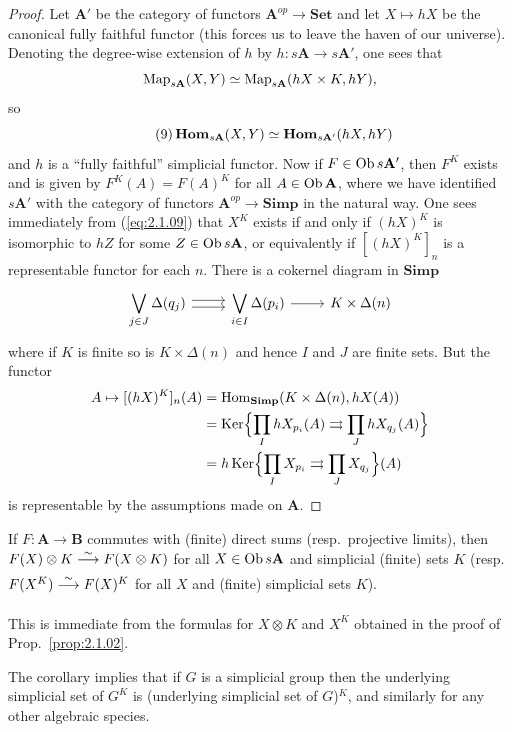 \documentclass[../main]{subfiles}
\begin{document}
\begin{proof}
Let $\mathbf A'$ be the category of functors $\mathbf A^{op} \longrightarrow \mathbf{Set}$ and let $X \mapsto hX$ be the canonical fully faithful functor (this forces us to leave the haven of our universe). Denoting the degree-wise extension of $h$ by $h \colon s\mathbf A \longrightarrow s\mathbf A'$, one sees that 
\[
\operatorname{Map}_{s\mathbf A}(X, Y) \simeq \operatorname{Map}_{s\mathbf A}(hX \times K, hY),
\]
so
\begin{equation}\tag{9}
\label{eq:2.1.09}
    \operatorname{\mathbf{Hom}}_{s\mathbf A}(X, Y) \simeq \operatorname{\mathbf{Hom}}_{s\mathbf A'}(hX, hY)
\end{equation}
and $h$ is a ``fully faithful'' simplicial functor. Now if $F \in \operatorname{Ob} s\mathbf A'$, then $F^K$ exists and is given by $F^K(A) = F(A)^K$ for all $A \in \operatorname{Ob}\mathbf A$, where we have identified $s\mathbf A'$ with the category of functors $\mathbf A^{op} \longrightarrow \mathbf{Simp}$ in the natural way. One sees immediately from (\ref{eq:2.1.09}) that $X^K$ exists if and only if $(hX)^K$ is isomorphic to $hZ$ for some $Z \in \operatorname{Ob} s\mathbf A$, or equivalently if $[(hX)^K]_n$ is a representable functor for each $n$. There is a cokernel diagram in $\mathbf{Simp}$ 
\[
\begin{tikzcd}
    \displaystyle\bigvee_{j \in J} \Delta(q_j) 
    \arrow[r, shift left = 1]
    \arrow[r, shift right = 1]
    &
    \displaystyle\bigvee_{i \in I} \Delta(p_i)
    \arrow[r]
    &
    K \times \Delta(n)
\end{tikzcd}
\]
where if $K$ is finite so is $K \times \Delta(n)$ and hence $I$ and $J$ are finite sets. But the functor 
\begin{align*}
    A \mapsto [(hX)^K]_n(A)
    &= \operatorname{Hom}_{\mathbf{Simp}} (K \times \Delta(n), hX(A))
    \\&= \operatorname{Ker}\Bigl\{\prod_I hX_{p_i} (A) \rightrightarrows \prod_J hX_{q_j}(A)\Bigr\}
    \\&= h\operatorname{Ker}\Bigl\{\prod_I X_{p_i} \rightrightarrows \prod_J X_{q_j}\Bigr\}(A)
\end{align*}
is representable by the assumptions made on $\mathbf A$.
\end{proof}

\begin{corollary*}
If $F \colon \mathbf A \longrightarrow \mathbf B$ commutes with (finite) direct sums (resp.\ projective limits), then $F(X) \otimes K \varrightarrow \sim F(X \otimes K)$ for all $X \in \operatorname{Ob} s\mathbf A$ and simplicial (finite) sets $K$ (resp.\ $F(X^K) \varrightarrow \sim F(X)^K$ for all $X$ and (finite) simplicial sets $K$).
\end{corollary*}

This is immediate from the formulas for $X \otimes K$ and $X^K$ obtained in the proof of Prop.\ \ref{prop:2.1.02}.

\begin{remark*}
The corollary implies that if $G$ is a simplicial group then the underlying simplicial set of $G^K$ is (underlying simplicial set of $G$)$^K$, and similarly for any other algebraic species.
\end{remark*}
\end{document}
